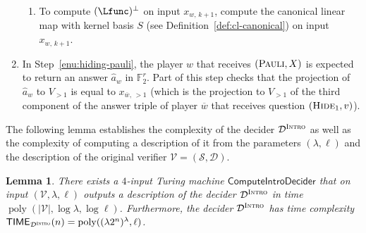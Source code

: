 \documentclass[11pt]{article}
\newtheorem{lemma}[theorem]{Lemma}
\theoremstyle{definition}
\newcommand{\F}{\ensuremath{\mathbb{F}}}
\DeclareMathOperator{\poly}{poly}
\newcommand{\abs}[1]{\left\vert {#1} \right\vert}
\newcommand{\sampler}{\mathcal{S}}
\newcommand{\decider}{\mathcal{D}}
\newcommand{\verifier}{\mathcal{V}}
\newcommand{\gamestyle}[1]{\ensuremath{\textsc{#1}}\xspace}
\newcommand{\intro}{\gamestyle{Intro}}
\newcommand{\trole}{\ensuremath{v}} %
\newcommand{\typestyle}[1]{\ensuremath{\textsc{#1}}\xspace}
\newcommand{\Pauli}{\typestyle{Pauli}}
\newcommand{\Hide}[1]{\typestyle{Hide}_{#1}}
\newcommand{\TIME}{\mathsf{TIME}}
\newcommand{\tmstyle}[1]{\ensuremath{\mathsf{#1}}}
\newcommand{\ComputeIntroDecider}{\tmstyle{ComputeIntroDecider}}
\begin{document}
\begin{enumerate}
\begin{enumerate}
  \item To compute $(\Lfunc)^\perp$ on input
    $x_{w,\, k+1}$, compute the canonical linear map with kernel basis
    $S$ (see Definition~\ref{def:cl-canonical}) on input $x_{w,\,
      k+1}$.
  \end{enumerate}

\item In Step~\ref{enu:hiding-pauli}, the player $w$ that receives $(\Pauli,X)$
  is expected to return an answer $\hat{a}_w$ in $\F_2^r$.
  Part of this step checks that the projection of $\hat{a}_w$ to $V_{>1}$ is
  equal to $x_{\overline{w},\, >1}$ (which is the projection to $V_{>1}$ of the
  third component of the answer triple of player $\overline{w}$ that receives
  question $(\Hide{1},\trole)$).

\end{enumerate}

The following lemma establishes the complexity of the decider $\decider^\intro$
as well as the complexity of computing a {description} of it from the parameters
$(\lambda,\ell)$ and the description of the original verifier $\verifier =
(\sampler,\decider)$.

\begin{lemma}
  \label{lem:intro-decider-complexity}
  There exists a $4$-input Turing machine $\ComputeIntroDecider$ that
  on input $(\verifier,\lambda,\ell)$ outputs a description of the decider
  $\decider^\intro$ in time $\poly(\abs{\verifier}, \log\lambda, \log\ell)$.
  Furthermore, the decider $\decider^\intro$ has time complexity
  $\TIME_{\decider^\intro}(n) = \poly((\lambda 2^n)^\lambda, \ell)$.
\end{lemma}
\end{document}
